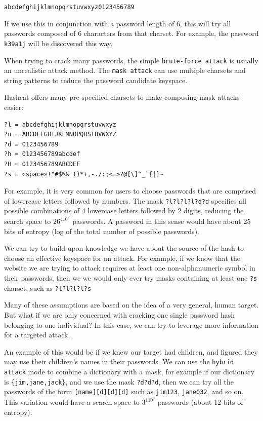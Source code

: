 \documentclass[acmlarge]{acmart}
\begin{document}
\begin{center}
\texttt{abcdefghijklmnopqrstuvwxyz0123456789}	
\end{center}

If we use this in conjunction with a password length of $6$, this will try all passwords composed of $6$ characters from that charset. For example, the password \texttt{k39a1j} will be discovered this way.

When trying to crack many passwords, the simple \texttt{brute-force attack} is usually an unrealistic attack method. The \texttt{mask attack} can use multiple charsets and string patterns to reduce the password candidate keyspace.

Hashcat offers many pre-specified charsets to make composing mask attacks easier:

\begin{center}
\begin{minipage}{8cm}
\begin{verbatim}
?l = abcdefghijklmnopqrstuvwxyz
?u = ABCDEFGHIJKLMNOPQRSTUVWXYZ
?d = 0123456789
?h = 0123456789abcdef
?H = 0123456789ABCDEF
?s = «space»!"#$%&'()*+,-./:;<=>?@[\]^_`{|}~
\end{verbatim}
\end{minipage}
\end{center}

For example, it is very common for users to choose passwords that are comprised of lowercase letters followed by numbers. The mask \texttt{?l?l?l?l?d?d} specifies all possible combinations of 4 lowercase letters followed by 2 digits, reducing the search space to $26^410^2$ passwords. A password in this sense would have about 25 bits of entropy (log of the total number of possible passwords).

We can try to build upon knowledge we have about the source of the hash to choose an effective keyspace for an attack. For example, if we know that the website we are trying to attack requires at least one non-alphanumeric symbol in their passwords, then we we would only ever try masks containing at least one \texttt{?s} charset, such as \texttt{?l?l?l?l?s}

Many of these assumptions are based on the idea of a very general, human target. But what if we are only concerned with cracking one single password hash belonging to one individual? In this case, we can try to leverage more information for a targeted attack.

An example of this would be if we knew our target had children, and figured they may use their children's names in their passwords. We can use the \texttt{hybrid attack} mode to combine a dictionary with a mask, for example if our dictionary is \verb|{jim,jane,jack}|, and we use the mask \texttt{?d?d?d}, then we can try all the passwords of the form \texttt{[name][d][d][d]} such as \texttt{jim123}, \texttt{jane032}, and so on. This variation would have a search space to $3^110^3$ passwords (about 12 bits of entropy).
\end{document}
